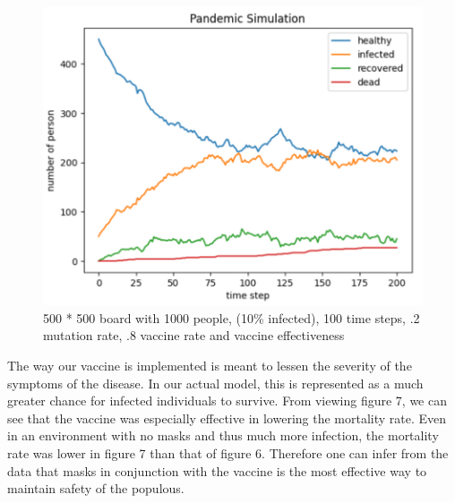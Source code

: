 \documentclass{article}
\begin{document}
\begin{figure}[H]
    \centering
    \includegraphics[width=.6\linewidth]{figure7.png}
    \caption{500 * 500 board with 1000 people, (10\% infected), 100 time steps, .2 mutation rate, .8 vaccine rate and vaccine effectiveness}
    \label{fig:enter-label}
\end{figure}
The way our vaccine is implemented is meant to lessen the severity of the symptoms of the disease. In our actual model, this is represented as a much greater chance for infected individuals to survive. From viewing figure 7, we can see that the vaccine was especially effective in lowering the mortality rate. Even in an environment with no masks and thus much more infection, the mortality rate was lower in figure 7 than that of figure 6. Therefore one can infer from the data that masks in conjunction with the vaccine is the most effective way to maintain safety of the populous. 
\\\\ \\\\ \\\\ \\\\ \\\\ \\\\ \\\\ \\\\ \\\\ \\\\ \\\\ \\\\ \\\\ \\\\
\end{document}
